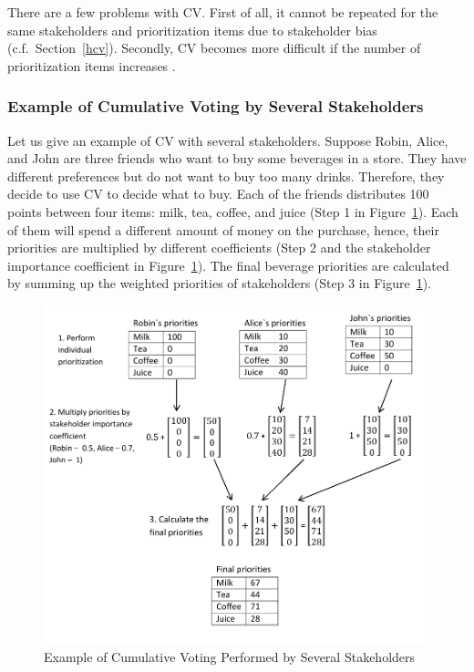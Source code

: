 There are a few problems with CV. First of all, it cannot be repeated for the
same stakeholders and prioritization items due to stakeholder bias
\citep{Leffingwell1999} (c.f.\ Section~\ref{hcv}). Secondly, CV becomes more difficult if the number of prioritization items increases \citep{Berander2009a}.

\subsubsection{Example of Cumulative Voting by Several Stakeholders}

Let us give an example of CV with several stakeholders. Suppose Robin,
Alice, and John are three friends who want to buy some beverages in
a store. They have different preferences but do not want to buy too
many drinks. Therefore, they decide to use CV to decide what to buy.
Each of the friends distributes 100 points between four items: milk,
tea, coffee, and juice (Step 1 in Figure~\ref{fig:Example-of-Cumulative}).
Each of them will spend a different amount of money on the purchase,
hence, their priorities are multiplied by different coefficients
(Step 2 and the stakeholder importance coefficient in Figure~\ref{fig:Example-of-Cumulative}).
The final beverage priorities are calculated by summing up the weighted priorities
of stakeholders (Step 3 in Figure~\ref{fig:Example-of-Cumulative}).


%
\begin{figure}
	\center
\includegraphics[scale=0.55]{fig/cv}

\caption{\label{fig:Example-of-Cumulative}Example of Cumulative Voting Performed
by Several Stakeholders}
%
\end{figure}

